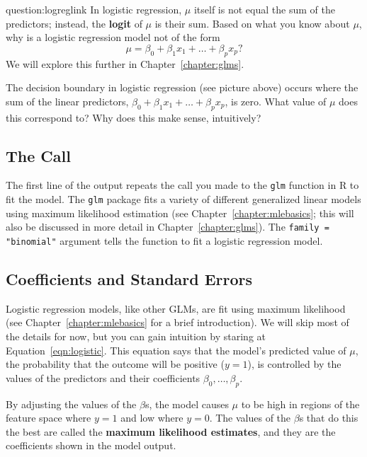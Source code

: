 \begin{question}{question:logreglink}
In logistic regression, $\mu$ itself is not equal the sum of the predictors; instead, the \textbf{logit} of $\mu$ is their sum. Based on what you know about $\mu$, why is a logistic regression model not of the form
$$ \mu = \beta_0 + \beta_1 x_1 + \dots + \beta_p x_p \text{?}$$
We will explore this further in Chapter~\ref{chapter:glms}.
\end{question}

\begin{question}{}
The decision boundary in logistic regression (see picture above) occurs where the sum of the linear predictors, $\beta_0 + \beta_1 x_1 + \dots + \beta_p x_p$, is zero. What value of $\mu$ does this correspond to? Why does this make sense, intuitively?
\end{question}

\subsection{The Call}

The first line of the output repeats the call you made to the \verb|glm| function in R to fit the model. The \texttt{glm} package fits a variety of different generalized linear models using maximum likelihood estimation (see Chapter~\ref{chapter:mlebasics}; this will also be discussed in more detail in Chapter~\ref{chapter:glms}). The \texttt{family = "binomial"} argument tells the function to fit a logistic regression model.

\subsection{Coefficients and Standard Errors}

Logistic regression models, like other GLMs, are fit using maximum likelihood (see Chapter~\ref{chapter:mlebasics} for a brief introduction). We will skip most of the details for now, but you can gain intuition by staring at Equation~\ref{eqn:logistic}. This equation says that the model's predicted value of $\mu$, the probability that the outcome will be positive ($y=1$), is controlled by the values of the predictors and their coefficients $\beta_0, \dots, \beta_p$. 

By adjusting the values of the $\beta$s, the model causes $\mu$ to be high in regions of the feature space where $y=1$ and low where $y=0$. The values of the $\beta$s that do this the best are called the \textbf{maximum likelihood estimates}, and they are the coefficients shown in the model output.

